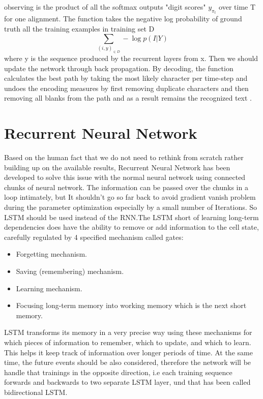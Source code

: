 observing is the product of all the softmax outputs "digit scores" $y_{\pi_{t}}$
over time T for one alignment. The function takes the negative log probability
of ground truth all the training examples in training set D
\begin{equation}
\sum_{(i,y)_{\in D}} - \log  p( I | Y )
\label{eq3}
\end{equation}
where y is the sequence produced by the recurrent layers from x. Then we should
update the network through back propagation. By decoding, the function
calculates the best path by taking the most likely character per time-step and
undoes the encoding measures by first removing duplicate characters and then
removing all blanks from the path and as a result remains the recognized text
\cite{CTC}.

\section{Recurrent Neural Network}\label{sec:rnn}
Based on the human fact that we do not need to rethink from scratch rather
building up on the available results, Recurrent Neural Network has been
developed to solve this issue with the normal neural network using connected
chunks of neural network. The information can be passed over the chunks in a
loop intimately, but It shouldn’t go so far back to avoid gradient vanish
problem during the parameter optimization especially by a small number of
Iterations. So LSTM should be used instead of the RNN.The LSTM short of learning
long-term dependencies does have the ability to remove or add information to the
cell state, carefully regulated by 4 specified mechanism called gates:
\begin{itemize}
\item Forgetting mechanism.
\item Saving (remembering) mechanism.
\item Learning mechanism.
\item Focusing long-term memory into working memory which is the next short memory.
\end{itemize}
LSTM transforms its memory in a very precise way using these mechanisms for
which pieces of information to remember, which to update, and which to learn.
This helps it keep track of information over longer periods of time. At the same
time, the future events should be also considered, therefore the network will be
handle that trainings in the opposite direction, i.e each training sequence
forwards and backwards to two separate LSTM layer, und that has been called
bidirectional LSTM. 